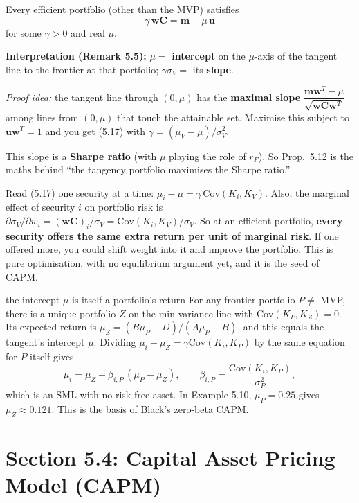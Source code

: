 \documentclass[titlepage,11pt,a4paper]{article}
\newcommand{\Cov}{\mathrm{Cov}}
\newcommand{\vw}{\boldsymbol{w}}
\newcommand{\vm}{\boldsymbol{m}}
\newcommand{\vu}{\boldsymbol{u}}
\newcommand{\vC}{\boldsymbol{C}}
\newcommand{\T}{^{T}}
\begin{document}
\begin{result}
Every efficient portfolio (other than the MVP) satisfies
\[\gamma\,\vw\vC=\vm-\mu\,\vu \tag{5.17}\]
for some $\gamma>0$ and real $\mu$.

\textbf{Interpretation (Remark 5.5):} $\mu=$ \textbf{intercept} on the $\mu$-axis of the tangent line to the frontier at that portfolio; $\gamma\sigma_V=$ its \textbf{slope}.
\end{result}

\emph{Proof idea:} the tangent line through $(0,\mu)$ has the \textbf{maximal slope} $\dfrac{\vm\vw\T-\mu}{\sqrt{\vw\vC\vw\T}}$ among lines from $(0,\mu)$ that touch the attainable set. Maximise this subject to $\vu\vw\T=1$ and you get (5.17) with $\gamma=(\mu_V-\mu)/\sigma_V^2$.

This slope is a \textbf{Sharpe ratio} (with $\mu$ playing the role of $r_F$). So Prop.\ 5.12 is the maths behind ``the tangency portfolio maximises the Sharpe ratio.''

\begin{intuition}
Read (5.17) one security at a time: $\mu_i-\mu=\gamma\,\Cov(K_i,K_V)$. Also, the marginal effect of security $i$ on portfolio risk is $\partial\sigma_V/\partial w_i=(\vw\vC)_i/\sigma_V=\Cov(K_i,K_V)/\sigma_V$. So at an efficient portfolio, \textbf{every security offers the same extra return per unit of marginal risk}. If one offered more, you could shift weight into it and improve the portfolio. This is pure optimisation, with no equilibrium argument yet, and it is the seed of CAPM.
\end{intuition}

\begin{deeper}{the intercept $\mu$ is itself a portfolio's return}
For any frontier portfolio $P\ne$ MVP, there is a unique portfolio $Z$ on the min-variance line with $\Cov(K_P,K_Z)=0$. Its expected return is $\mu_Z=(B\mu_P-D)/(A\mu_P-B)$, and this equals the tangent's intercept $\mu$. Dividing $\mu_i-\mu_Z=\gamma\Cov(K_i,K_P)$ by the same equation for $P$ itself gives
\[\mu_i=\mu_Z+\beta_{i,P}\,(\mu_P-\mu_Z),\qquad \beta_{i,P}=\frac{\Cov(K_i,K_P)}{\sigma_P^2},\]
which is an SML with no risk-free asset. In Example 5.10, $\mu_P=0.25$ gives $\mu_Z\approx0.121$. This is the basis of Black's zero-beta CAPM.
\end{deeper}

\section{Section 5.4: Capital Asset Pricing Model (CAPM)}
\end{document}
